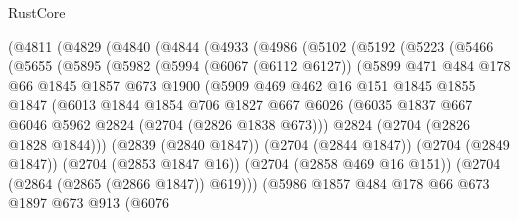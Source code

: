 \begin{lexlean}{RustCore}
\begin{coremodule}
    (@4811
      (@4829
        (@4840
          (@4844
            (@4933
              (@4986
                (@5102
                  (@5192
                    (@5223
                      (@5466
                        (@5655
                          (@5895
                            (@5982
                              (@5994
                                (@6067 (@6112 @6127))
                                (@5899
                                  @471
                                  @484
                                  @178
                                  @66
                                  @1845
                                  @1857
                                  @673
                                  @1900
                                  (@5909
                                    @469
                                    @462
                                    @16
                                    @151
                                    @1845
                                    @1855
                                    @1847
                                    (@6013
                                      @1844
                                      @1854
                                      @706
                                      @1827
                                      @667
                                      @6026
                                      (@6035
                                        @1837
                                        @667
                                        @6046
                                        @5962
                                        @2824
                                        (@2704 (@2826 @1838 @673)))
                                      @2824
                                      (@2704 (@2826 @1828 @1844)))
                                    (@2839 (@2840 @1847))
                                    (@2704 (@2844 @1847))
                                    (@2704 (@2849 @1847))
                                    (@2704 (@2853 @1847 @16))
                                    (@2704 (@2858 @469 @16 @151))
                                    (@2704 (@2864 (@2865 (@2866 @1847)) @619)))
                                  (@5986
                                    @1857
                                    @484
                                    @178
                                    @66
                                    @673
                                    @1897
                                    @673
                                    @913
                                    (@6076

\end{coremodule}
\end{lexlean}

